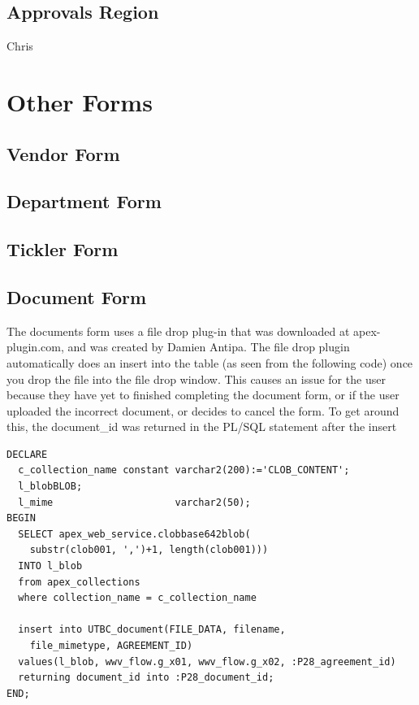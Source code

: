 \documentclass{report}
\begin{document}
\subsection{Approvals Region}
Chris

\section{Other Forms}

\subsection{Vendor Form}

\subsection{Department Form}

\subsection{Tickler Form}

\subsection{Document Form}
The documents form uses a file drop plug-in that was downloaded at apex-plugin.com, and was created by Damien Antipa. The file drop plugin automatically does an insert into the table (as seen from the following code) once you drop the file into the file drop window. This causes an issue for the user because they have yet to finished completing the document form, or if the user uploaded the incorrect document, or decides to cancel the form. To get around this, the document\_id was returned in the PL/SQL statement after the insert

\begin{lstlisting}[caption = PL/SQL on filedrop item]
DECLARE
  c_collection_name constant varchar2(200):='CLOB_CONTENT';
  l_blobBLOB;
  l_mime				     varchar2(50);
BEGIN
  SELECT apex_web_service.clobbase642blob(
  	substr(clob001, ',')+1, length(clob001)))
  INTO l_blob
  from apex_collections
  where collection_name = c_collection_name
  
  insert into UTBC_document(FILE_DATA, filename, 
  	file_mimetype, AGREEMENT_ID) 
  values(l_blob, wwv_flow.g_x01, wwv_flow.g_x02, :P28_agreement_id)
  returning document_id into :P28_document_id;
END;
\end{lstlisting}
\end{document}
